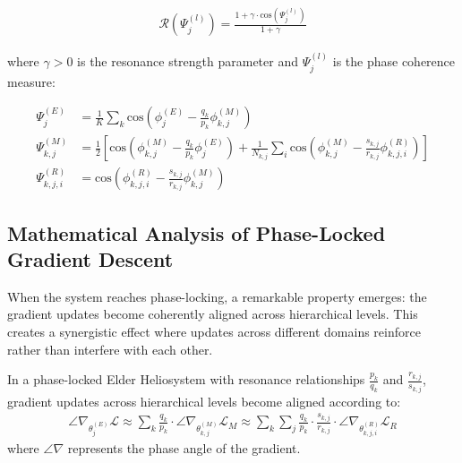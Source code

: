 \begin{align}
\mathcal{R}(\Psi^{(l)}_j) = \frac{1 + \gamma \cdot \text{cos}(\Psi^{(l)}_j)}{1 + \gamma}
\end{align}

where $\gamma > 0$ is the resonance strength parameter and $\Psi^{(l)}_j$ is the phase coherence measure:

\begin{align}
\Psi^{(E)}_j &= \frac{1}{K}\sum_k \text{cos}\left(\phi^{(E)}_j - \frac{q_k}{p_k}\phi^{(M)}_{k,j}\right) \\
\Psi^{(M)}_{k,j} &= \frac{1}{2}\left[\text{cos}\left(\phi^{(M)}_{k,j} - \frac{q_k}{p_k}\phi^{(E)}_j\right) + \frac{1}{N_{k,j}}\sum_i \text{cos}\left(\phi^{(M)}_{k,j} - \frac{s_{k,j}}{r_{k,j}}\phi^{(R)}_{k,j,i}\right)\right] \\
\Psi^{(R)}_{k,j,i} &= \text{cos}\left(\phi^{(R)}_{k,j,i} - \frac{s_{k,j}}{r_{k,j}}\phi^{(M)}_{k,j}\right)
\end{align}

\subsection{Mathematical Analysis of Phase-Locked Gradient Descent}

When the system reaches phase-locking, a remarkable property emerges: the gradient updates become coherently aligned across hierarchical levels. This creates a synergistic effect where updates across different domains reinforce rather than interfere with each other.

\begin{theorem}
In a phase-locked Elder Heliosystem with resonance relationships $\frac{p_k}{q_k}$ and $\frac{r_{k,j}}{s_{k,j}}$, gradient updates across hierarchical levels become aligned according to:
\begin{align}
\angle\nabla_{\theta^{(E)}_j}\mathcal{L} \approx \sum_k \frac{q_k}{p_k} \cdot \angle\nabla_{\theta^{(M)}_{k,j}}\mathcal{L}_M \approx \sum_k \sum_j \frac{q_k}{p_k} \cdot \frac{s_{k,j}}{r_{k,j}} \cdot \angle\nabla_{\theta^{(R)}_{k,j,i}}\mathcal{L}_R
\end{align}
where $\angle\nabla$ represents the phase angle of the gradient.
\end{theorem}

